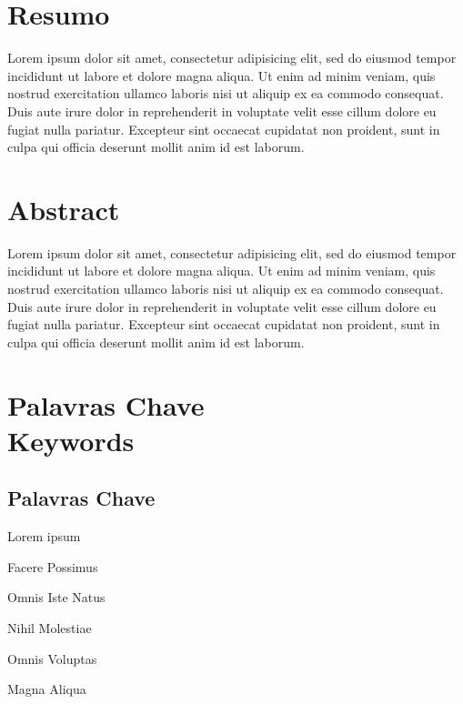 \cleardoublepage


\chapter*{Resumo}
\thispagestyle{empty}

Lorem ipsum dolor sit amet, consectetur adipisicing elit, sed do eiusmod tempor incididunt ut labore et dolore magna aliqua. Ut enim ad minim veniam, quis nostrud exercitation ullamco laboris nisi ut aliquip ex ea commodo consequat. Duis aute irure dolor in reprehenderit in voluptate velit esse cillum dolore eu fugiat nulla pariatur. Excepteur sint occaecat cupidatat non proident, sunt in culpa qui officia deserunt mollit anim id est laborum.

\newpage


\chapter*{Abstract}
\thispagestyle{empty}

Lorem ipsum dolor sit amet, consectetur adipisicing elit, sed do eiusmod tempor incididunt ut labore et dolore magna aliqua. Ut enim ad minim veniam, quis nostrud exercitation ullamco laboris nisi ut aliquip ex ea commodo consequat. Duis aute irure dolor in reprehenderit in voluptate velit esse cillum dolore eu fugiat nulla pariatur. Excepteur sint occaecat cupidatat non proident, sunt in culpa qui officia deserunt mollit anim id est laborum\cite{shvachko2010hdfs}.

\newpage


\chapter*{Palavras Chave \\ Keywords}
\thispagestyle{empty}

\section*{Palavras Chave}
{\large %

\noindent Lorem ipsum

\noindent Facere Possimus

\noindent Omnis Iste Natus

\noindent Nihil Molestiae

\noindent Omnis Voluptas

\noindent Magna Aliqua

}

